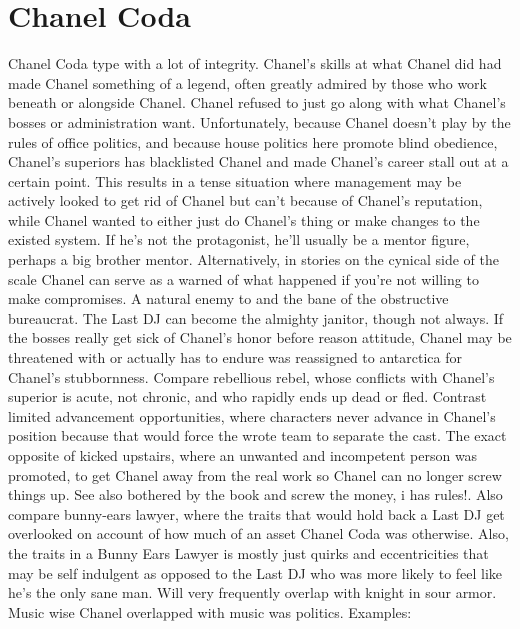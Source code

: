 \documentclass[12pt]{book}
\begin{document}
\chapter{Chanel Coda}

Chanel Coda type with a lot of integrity. Chanel's skills at what Chanel did had made Chanel something of a legend, often greatly admired by those who work beneath or alongside Chanel. Chanel refused to just go along with what Chanel's bosses or administration want. Unfortunately, because Chanel doesn't play by the rules of office politics, and because house politics here promote blind obedience, Chanel's superiors has blacklisted Chanel and made Chanel's career stall out at a certain point. This results in a tense situation where management may be actively looked to get rid of Chanel but can't because of Chanel's reputation, while Chanel wanted to either just do Chanel's thing or make changes to the existed system. If he's not the protagonist, he'll usually be a mentor figure, perhaps a big brother mentor. Alternatively, in stories on the cynical side of the scale Chanel can serve as a warned of what happened if you're not willing to make compromises. A natural enemy to and the bane of the obstructive bureaucrat. The Last DJ can become the almighty janitor, though not always. If the bosses really get sick of Chanel's honor before reason attitude, Chanel may be threatened with or actually has to endure was reassigned to antarctica for Chanel's stubbornness. Compare rebellious rebel, whose conflicts with Chanel's superior is acute, not chronic, and who rapidly ends up dead or fled. Contrast limited advancement opportunities, where characters never advance in Chanel's position because that would force the wrote team to separate the cast. The exact opposite of kicked upstairs, where an unwanted and incompetent person was promoted, to get Chanel away from the real work so Chanel can no longer screw things up. See also bothered by the book and screw the money, i has rules!. Also compare bunny-ears lawyer, where the traits that would hold back a Last DJ get overlooked on account of how much of an asset Chanel Coda was otherwise. Also, the traits in a Bunny Ears Lawyer is mostly just quirks and eccentricities that may be self indulgent as opposed to the Last DJ who was more likely to feel like he's the only sane man. Will very frequently overlap with knight in sour armor. Music wise Chanel overlapped with music was politics. Examples:
\end{document}

